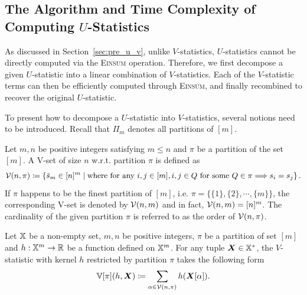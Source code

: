 \documentclass[letterpaper,11pt]{article}
\def\Einsum{\textsc{Einsum}}
\newcommand{\pdfu}{\texorpdfstring{$U$}{U}}
\newcommand{\sPi}{\pi}
\newcommand{\vset}{\calV}
\newcommand{\vsetp}[2]{\vset(#1,#2)}
\newcommand{\vstat}{\mathbb{V}}
\newcommand{\partition}{\Pi}
\newcommand{\partitionp}[1]{\partition_{#1}}
\begin{document}
\begin{bibunit}[plainnat]
\subsection{The Algorithm and Time Complexity of Computing \pdfu{}-Statistics}
\label{sec:alg_u}

As discussed in Section~\ref{sec:pre_u_v}, unlike $V$-statistics, $U$-statistics cannot be directly computed via the \Einsum{} operation. Therefore, we first decompose a given $U$-statistic into a linear combination of $V$-statistics. Each of the $V$-statistic terms can then be efficiently computed through \Einsum{}, and finally recombined to recover the original $U$-statistic.

To present how to decompose a $U$-statistic into $V$-statistics, several notions need to be introduced. Recall that $\partitionp{m}$ denotes all partitions of $[m]$. %

\begin{definition}[V-Set]\label{def:v_set}
     Let $m,n$ be positive integers satisfying $m \leq n$ and $\sPi$ be a partition of the set $[m]$. A V-set of size $n$ w.r.t. partition $\sPi$ is defined as
    \begin{align*}
        \vsetp{n}{\sPi} \coloneqq \left\{ \bar{s}_{m} \in [n]^m \mid \text{where for any $i, j \in [m]$},i, j \in Q \text{ for some $Q \in \sPi$}  \Longrightarrow  s_i = s_j \right\}.
    \end{align*}
    If $\sPi$ happens to be the finest partition of $[m]$, i.e. $\sPi = \{\{1\}, \{2\}, \cdots, \{m\}\}$, the corresponding V-set is denoted by $\vsetp{n}{m}$ and in fact, $\vsetp{n}{m} = [n]^m$. The cardinality of the given partition $\sPi$ is referred to as the order of $\vsetp{n}{\sPi}$.
\end{definition}

\begin{definition}\label{def:res_v_stat}
Let ${\mathbb{X}}$ be a non-empty set, $m, n$ be positive integers, $\sPi$ be a partition of set $[m]$ and $h: {\mathbb{X}}^{m} \rightarrow {\mathbb{R}}$ be a function defined on ${\mathbb{X}}^m$. For any tuple $\bm{X} \in {\mathbb{X}}^*$, the $V$-statistic with kernel $h$ restricted by partition $\sPi$ takes the following form 
\begin{align*}
\vstat[\sPi](h,\bm{X}) \coloneqq \sum_{\alpha \in \vsetp{n}{\sPi}} h(\bm{X}[\alpha]). 
\end{align*}
\end{definition}


\end{bibunit}
\end{document}
